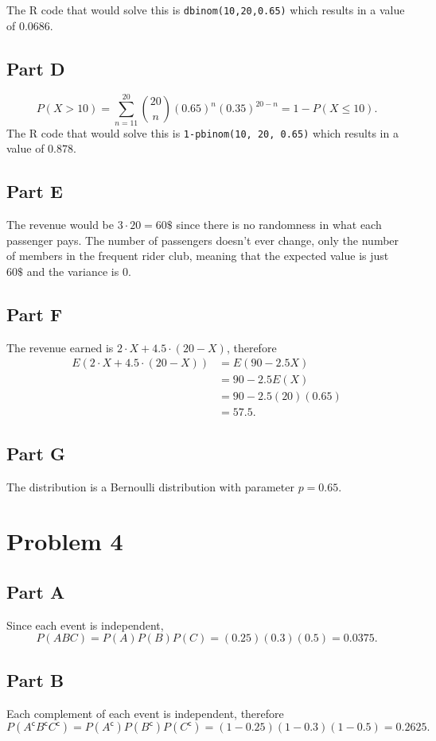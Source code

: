 \documentclass[12pt]{extarticle}
\renewcommand\complement{\mathsf{c}}
\begin{document}
The R code that would solve this is \verb|dbinom(10,20,0.65)| which results in a value of $0.0686$.

\subsection*{Part D}
\[
	P(X > 10) = \sum_{n=11}^{20} \binom{20}{n} (0.65)^n (0.35)^{20-n} = 1 - P(X \leq 10)
.\]
The R code that would solve this is \verb|1-pbinom(10, 20, 0.65)| which results in a value of $0.878$.

\subsection*{Part E}
The revenue would be $3 \cdot 20 = 60\$$ since there is no randomness in what each passenger pays. The number of passengers doesn't ever change, only the number of members in the frequent rider club, meaning that the expected value is just $60\$$ and the variance is $0$.

\subsection*{Part F}
The revenue earned is $2\cdot X + 4.5 \cdot (20 - X)$, therefore
\begin{align*}
	E(2\cdot X + 4.5 \cdot (20 - X)) &= E(90 - 2.5 X) \\
	&= 90 - 2.5 E(X) \\
	&= 90 - 2.5 (20) (0.65) \\
	&= 57.5
.\end{align*}

\subsection*{Part G}
The distribution is a Bernoulli distribution with parameter $p = 0.65$.

\section*{Problem 4}
\subsection*{Part A}
Since each event is independent,
\[
	P(ABC) = P(A) P(B) P(C) = (0.25)(0.3)(0.5) = 0.0375
.\]

\subsection*{Part B}
Each complement of each event is independent, therefore
\[
	P(A^\complement B^\complement C^\complement) = P(A^\complement)  P(B^\complement) P(C^\complement) = (1 - 0.25) (1 - 0.3) (1 - 0.5) = 0.2625
.\]
\end{document}
